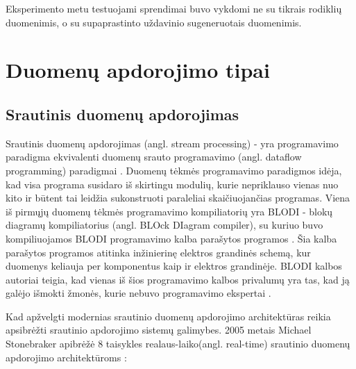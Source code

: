 \documentclass{VUMIFPSkursinis}
\begin{document}
Eksperimento metu testuojami sprendimai buvo vykdomi ne su tikrais rodiklių duomenimis, o su supaprastinto uždavinio sugeneruotais duomenimis.

\section{Duomenų apdorojimo tipai}

\subsection{Srautinis duomenų apdorojimas} \label{strprocess}

    Srautinis duomenų apdorojimas (angl. stream processing) - yra programavimo paradigma ekvivalenti duomenų srauto programavimo (angl. dataflow programming) paradigmai \cite{shortstreamproc}. 
Duomenų tėkmės programavimo paradigmos idėja, kad visa programa susidaro iš skirtingu modulių, kurie nepriklauso vienas nuo kito ir būtent tai leidžia sukonstruoti paraleliai skaičiuojančias programas. 
Viena iš pirmųjų duomenų tėkmės programavimo kompiliatorių yra BLODI - blokų diagramų kompiliatorius (angl. BLOck DIagram compiler), su kuriuo buvo kompiliuojamos 
BLODI programavimo kalba parašytos programos \cite{kelly1961block}.  Šia kalba parašytos programos atitinka inžinierinę elektros grandinės schemą, 
kur duomenys keliauja per komponentus kaip ir elektros grandinėje. BLODI kalbos autoriai teigia, kad vienas iš šios programavimo kalbos privalumų yra tas, 
kad ją galėjo išmokti žmonės, kurie nebuvo programavimo ekspertai .\par
Kad apžvelgti modernias srautinio duomenų apdorojimo architektūras reikia apsibrėžti srautinio apdorojimo sistemų galimybes.
2005 metais Michael Stonebraker apibrėžė 8 taisykles realaus-laiko(angl. real-time) srautinio duomenų apdorojimo architektūroms \cite{stonebraker20058}:
\end{document}
